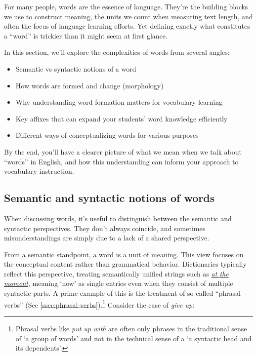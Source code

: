 For many people, words are the essence of language. They're the building blocks we use to construct meaning, the units we count when measuring text length, and often the focus of language learning efforts. Yet defining exactly what constitutes a ``word'' is trickier than it might seem at first glance.

In this section, we'll explore the complexities of words from several angles:

\begin{itemize}
    \item Semantic vs syntactic notions of a word
    \item How words are formed and change (morphology)
    \item Why understanding word formation matters for vocabulary learning
    \item Key affixes that can expand your students' word knowledge efficiently
    \item Different ways of conceptualizing words for various purposes
\end{itemize}
By the end, you'll have a clearer picture of what we mean when we talk about ``words'' in English, and how this understanding can inform your approach to vocabulary instruction.

\subsection{Semantic and syntactic notions of words}

When discussing words, it's useful to distinguish between the semantic and syntactic perspectives. They don't always coincide, and sometimes misunderstandings are simply due to a lack of a shared perspective.

From a semantic standpoint, a word is a unit of meaning. This view focuses on the conceptual content rather than grammatical behavior. Dictionaries typically reflect this perspective, treating semantically unified strings such as \href{https://www.ldoceonline.com/dictionary/have-a-go}{\textit{at the moment}}, meaning `now' as single entries even when they consist of multiple syntactic parts. A prime example of this is the treatment of so-called ``phrasal verbs'' (See \ref{ssec:phrasal-verbs}).\footnote{Phrasal verbs like \textit{put up with} are often only phrases in the traditional sense of `a group of words' and not in the technical sense of a `a syntactic head and its dependents'.} Consider the case of \textit{give up}:

